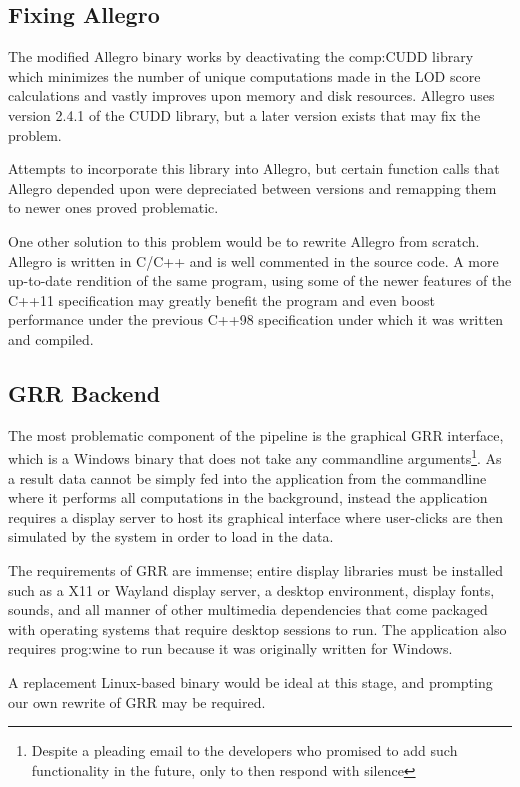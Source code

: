 \subsection{Fixing Allegro}

The modified Allegro binary works by deactivating the \gls{comp:CUDD} library which minimizes the number of unique computations made in the LOD score calculations and vastly improves upon memory and disk resources. Allegro uses version 2.4.1 of the CUDD library, but a later version exists that may fix the problem.

Attempts to incorporate this library into Allegro, but certain function calls that Allegro depended upon were depreciated between versions and remapping them to newer ones proved problematic. 

One other solution to this problem would be to rewrite Allegro from scratch. Allegro is written in C/C++ and is well commented in the source code. A more up-to-date rendition of the same program, using some of the newer features of the C++11 specification \cite{c++2011iso} may greatly benefit the program and even boost performance under the previous C++98 specification under which it was written and compiled.

\subsection{GRR Backend}

The most problematic component of the pipeline is the graphical GRR interface, which is a Windows binary that does not take any commandline arguments\footnote{Despite a pleading email to the developers who promised to add such functionality in the future, only to then respond with silence}. As a result data cannot be simply fed into the application from the commandline where it performs all computations in the background, instead the application requires a display server to host its graphical interface where user-clicks are then simulated by the system in order to load in the data.

The requirements of GRR are immense; entire display libraries must be installed such as a X11 or Wayland display server, a desktop environment, display fonts, sounds, and all manner of other multimedia dependencies that come packaged with operating systems that require desktop sessions to run. The application also requires \gls{prog:wine} to run because it was originally written for Windows.

A replacement Linux-based binary would be ideal at this stage, and prompting our own rewrite of GRR may be required.


